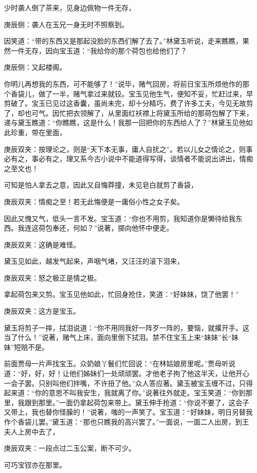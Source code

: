 \begin{parag}
    少时袭人倒了茶来，见身边佩物一件无存，\begin{note}庚辰侧：袭人在玉兄一身无时不照察到。\end{note}因笑道：“带的东西又是那起没脸的东西们解了去了。”林黛玉听说，走来瞧瞧，果然一件无存，因向宝玉道：“我给你的那个荷包也给他们了？\begin{note}庚辰侧：又起楼阁。\end{note}你明儿再想我的东西，可不能够了！”说毕，赌气回房，将前日宝玉所烦他作的那个香袋儿，做了一半，赌气拿过来就铰。宝玉见他生气，便知不妥，忙赶过来，早剪破了。宝玉已见过这香囊，虽尚未完，却十分精巧，费了许多工夫，今见无故剪了，却也可气。因忙把衣领解了，从里面红袄襟上将黛玉所给的那荷包解了下来，递与黛玉瞧道：“你瞧瞧，这是什么！我那一回把你的东西给人了？”林黛玉见他如此珍重，带在里面，\begin{note}庚辰双夹：按理论之，则是“天下本无事，庸人自扰之”。若以儿女之情论之，则事必有之，事必有之，理又系今古小说中不能道得写得，谈情者不能说出讲出，情痴之至文也！\end{note}可知是怕人拿去之意，因此又自悔莽撞，未见皂白就剪了香袋，\begin{note}庚辰双夹：情痴之至！若无此悔便是一庸俗小性之女子矣。\end{note}因此又愧又气，低头一言不发。宝玉道：“你也不用剪，我知道你是懒待给我东西。我连这荷包奉还，何如？”说著，掷向他怀中便走。\begin{note}庚辰双夹：这确是难怪。\end{note}黛玉见如此，越发气起来，声咽气堵，又汪汪的滚下泪来，\begin{note}庚辰双夹：怒之极正是情之极。\end{note}拿起荷包来又剪。宝玉见他如此，忙回身抢住，笑道：“好妹妹，饶了他罢！”\begin{note}庚辰双夹：这方是宝玉。\end{note}黛玉将剪子一摔，拭泪说道：“你不用同我好一阵歹一阵的，要恼，就撂开手。这当了什么！”说著，赌气上床，面向里倒下拭泪。禁不住宝玉上来“妹妹”长“妹妹”短赔不是。
\end{parag}


\begin{parag}
    前面贾母一片声找宝玉。众奶娘丫鬟们忙回说：“在林姑娘房里呢。”贾母听说道：“好，好，好！让他们姊妹们一处顽顽罢。才他老子拘了他这半天，让他开心一会子罢。只别叫他们拌嘴，不许扭了他。”众人答应著。黛玉被宝玉缠不过，只得起来道：“你的意思不叫我安生，我就离了你。”说著往外就走。宝玉笑道：“你到那里，我跟到那里。”一面仍拿起荷包来带上。黛玉伸手抢道：“你说不要了，这会子又带上，我也替你怪臊的！”说著，嗤的一声笑了。宝玉道：“好妹妹，明日另替我作个香袋儿罢。”黛玉道：“那也只瞧我的高兴罢了。”一面说，一面二人出房，到王夫人上房中去了，\begin{note}庚辰双夹：一段点过二玉公案，断不可少。\end{note}可巧宝钗亦在那里。
\end{parag}


